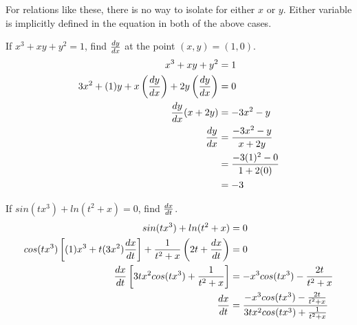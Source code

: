 For relations like these, there is no way to isolate for either $ x $ or $ y $. Either variable is implicitly defined in the equation in both of the above cases. \\

\begin{exercise}\nonumber
    If $ x^3 + xy + y^2 = 1 $, find $ dy \over dx $ at the point $ (x, y) = (1, 0) $. \\

    \begin{align}
        x^3 + xy + y^2                                                           & = 1                            \\
        3x^2 + (1)y + x\left({dy \over dx}\right) + 2y\left({dy \over dx}\right) & = 0                            \\
        {dy \over dx}(x + 2y)                                                    & = -3x^2 - y                    \\
        {dy \over dx}                                                            & = {-3x^2 - y \over x +2y}      \\
                                                                                 & = {-3(1)^2 - 0 \over 1 + 2(0)} \\
                                                                                 & = -3
    \end{align}
\end{exercise}

\begin{exercise}\nonumber
    If $ sin(tx^3) + ln(t^2 + x) = 0 $, find $ dx \over dt $. \\

    \begin{align}
        sin(tx^3) + ln(t^2 + x)                                                                              & = 0                                                                         \\
        cos(tx^3)\left[(1)x^3 + t(3x^2){dx \over dt}\right] + {1 \over t^2+x}\left(2t + {dx \over dt}\right) & = 0                                                                         \\
        {dx \over dt}\left[3tx^2cos(tx^3) + {1 \over t^2+x}\right]                                           & = -x^3cos(tx^3) - {2t \over t^2+x}                                          \\
        {dx \over dt}                                                                                        & = {-x^3cos(tx^3) - {2t \over t^2+x} \over 3tx^2cos(tx^3) + {1 \over t^2+x}}
    \end{align}
\end{exercise}

